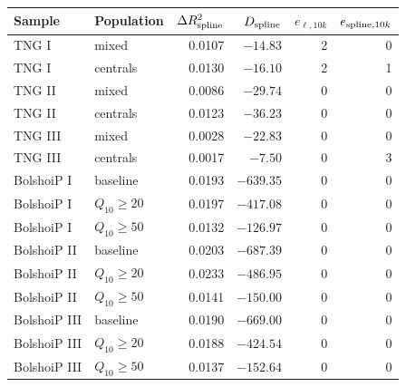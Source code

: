 \begin{tabular}{llrrrr}
\toprule
Sample & Population & $\Delta R^2_{\rm spline}$ & $D_{\rm spline}$ & $e_{\ell,10k}$ & $e_{{\rm spline},10k}$\\
\midrule
TNG I & mixed & 0.0107 & $-14.83$ & 2 & 0\\
TNG I & centrals & 0.0130 & $-16.10$ & 2 & 1\\
TNG II & mixed & 0.0086 & $-29.74$ & 0 & 0\\
TNG II & centrals & 0.0123 & $-36.23$ & 0 & 0\\
TNG III & mixed & 0.0028 & $-22.83$ & 0 & 0\\
TNG III & centrals & 0.0017 & $-7.50$ & 0 & 3\\
BolshoiP I & baseline & 0.0193 & $-639.35$ & 0 & 0\\
BolshoiP I & $Q_{10}\geq20$ & 0.0197 & $-417.08$ & 0 & 0\\
BolshoiP I & $Q_{10}\geq50$ & 0.0132 & $-126.97$ & 0 & 0\\
BolshoiP II & baseline & 0.0203 & $-687.39$ & 0 & 0\\
BolshoiP II & $Q_{10}\geq20$ & 0.0233 & $-486.95$ & 0 & 0\\
BolshoiP II & $Q_{10}\geq50$ & 0.0141 & $-150.00$ & 0 & 0\\
BolshoiP III & baseline & 0.0190 & $-669.00$ & 0 & 0\\
BolshoiP III & $Q_{10}\geq20$ & 0.0188 & $-424.54$ & 0 & 0\\
BolshoiP III & $Q_{10}\geq50$ & 0.0137 & $-152.64$ & 0 & 0\\
\bottomrule
\end{tabular}
